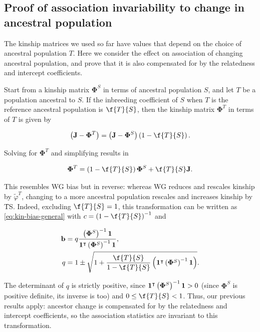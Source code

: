 \documentclass[11pt]{article}
\newcommand{\kinMat}[1][T]{%
  \ensuremath{%
    \mathbf{\Phi}^{#1}
  }%
  \xspace%
}%
\begin{document}
\begin{linenumbers}
\subsection{Proof of association invariability to change in ancestral population}

The kinship matrices we used so far have values that depend on the choice of ancestral population $T$.
Here we consider the effect on association of changing ancestral population, and prove that it is also compensated for by the relatedness and intercept coefficients.

Start from a kinship matrix \kinMat[S] in terms of ancestral population $S$, and let $T$ be a population ancestral to $S$.
If the inbreeding coefficient of $S$ when $T$ is the reference ancestral population is $\f{T}{S}$, then the kinship matrix \kinMat in terms of $T$ is given by \citep{ochoa_estimating_2021}
\begin{linenomath*}
$$
\left( \mathbf{J} - \kinMat \right)
=
\left( \mathbf{J} - \kinMat[S] \right) \left( 1 - \f{T}{S} \right)
.
$$
\end{linenomath*}
Solving for \kinMat and simplifying results in
\begin{linenomath*}
$$
\kinMat
=
\left( 1 - \f{T}{S} \right) \kinMat[S] + \f{T}{S} \mathbf{J}
.
$$
\end{linenomath*}
This resembles WG bias but in reverse: whereas WG reduces and rescales kinship by $\tilde{\varphi}^T$, changing to a more ancestral population rescales and increases kinship by \f{T}{S}.
Indeed, excluding $\f{T}{S} = 1$, this transformation can be written as \cref{eq:kin-bias-general} with
$c = \left( 1 - \f{T}{S} \right)^{-1}$ and
\begin{linenomath*}
\begin{align*}
  \mathbf{b}
  &=
    q \frac{ \left( \kinMat[S] \right)^{-1} \mathbf{1} }{ \mathbf{1}^\intercal \left( \kinMat[S] \right)^{-1} \mathbf{1} }
    , \\
  q
  &=
    1 \pm \sqrt{1 + \frac{ \f{T}{S} }{ 1 - \f{T}{S} } \left( \mathbf{1}^\intercal \left( \kinMat[S] \right)^{-1} \mathbf{1} \right) }
    .
\end{align*}
\end{linenomath*}
The determinant of $q$ is strictly positive, since $\mathbf{1}^\intercal \left( \kinMat[S] \right)^{-1} \mathbf{1} > 0$ (since \kinMat[S] is positive definite, its inverse is too) and $0 \le \f{T}{S} < 1$.
Thus, our previous results apply: ancestor change is compensated for by the relatedness and intercept coefficients, so the association statistics are invariant to this transformation.


\end{linenumbers}
\end{document}
